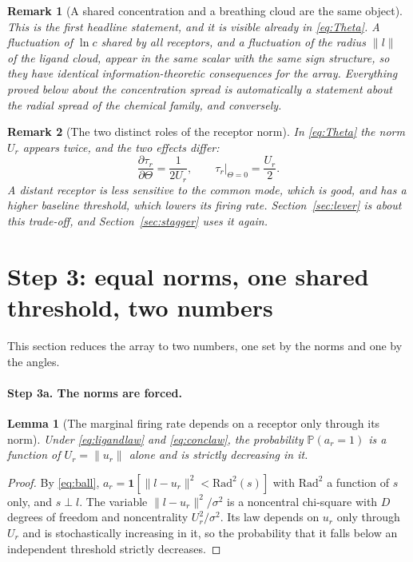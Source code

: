 \documentclass[11pt,a4paper]{article}
\newtheorem{lemma}{Lemma}
\newtheorem{remark}{Remark}
\newcommand{\PP}{\mathbb{P}}
\begin{document}
\begin{remark}[A shared concentration and a breathing cloud are the same object]
This is the first headline statement, and it is visible already in \eqref{eq:Theta}. A
fluctuation of $\ln c$ shared by all receptors, and a fluctuation of the radius $\|l\|$
of the ligand cloud, appear in the same scalar with the same sign structure, so they
have identical information-theoretic consequences for the array. Everything proved below
about the concentration spread is automatically a statement about the radial spread of
the chemical family, and conversely.
\end{remark}

\begin{remark}[The two distinct roles of the receptor norm]
In \eqref{eq:Theta} the norm $U_r$ appears twice, and the two effects differ:
\begin{equation}
  \frac{\partial \tau_r}{\partial \Theta} = \frac{1}{2U_r},
  \qquad
  \tau_r\big|_{\Theta=0} = \frac{U_r}{2}.
\end{equation}
A distant receptor is \emph{less} sensitive to the common mode, which is good, and has a
\emph{higher} baseline threshold, which lowers its firing rate. Section~\ref{sec:lever}
is about this trade-off, and Section~\ref{sec:stagger} uses it again.
\end{remark}

\section{Step 3: equal norms, one shared threshold, two numbers}
\label{sec:step3}

This section reduces the array to two numbers, one set by the norms and one by the angles.

\paragraph{Step 3a. The norms are forced.}

\begin{lemma}[The marginal firing rate depends on a receptor only through its norm]
\label{lem:norm}
Under \eqref{eq:ligandlaw} and \eqref{eq:conclaw}, the probability $\PP(a_r=1)$ is a
function of $U_r=\|u_r\|$ alone and is strictly decreasing in it.
\end{lemma}

\begin{proof}
By \eqref{eq:ball}, $a_r = \mathbf{1}[\|l-u_r\|^2 < \mathrm{Rad}^2(s)]$ with
$\mathrm{Rad}^2$ a function of $s$ only, and $s \perp l$. The variable
$\|l-u_r\|^2/\sigma^2$ is a noncentral chi-square with $D$ degrees of freedom and
noncentrality $U_r^2/\sigma^2$. Its law depends on $u_r$ only through $U_r$ and is
stochastically increasing in it, so the probability that it falls below an independent
threshold strictly decreases.
\end{proof}
\end{document}
